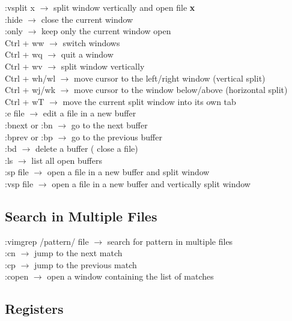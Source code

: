 \documentclass[twoside,a4paper]{article}
\newcommand{\tcb}{\color{blue}}
\newcommand{\tcc}{\color{cyan}}
\newcommand{\tcr}{\color{red}}
\newcommand{\tck}{\color{black}}
\newcommand{\ra }{$\rightarrow$ }
\begin{document}
\begin{multicols}{2}
		\tcr :vsplit x \tck \ra split window
		vertically and open file \textbf{x}\\
		\tcr :hide \tck \ra close the current 
		window\\
		\tcr :only \tck \ra keep only the 
		current window open\\
		\tcr Ctrl + ww \tck \ra switch windows\\
		\tcr Ctrl + wq \tck \ra quit a window\\
		\tcr Ctrl + wv \tck \ra split window 
		vertically\\
		\tcr Ctrl + wh/wl \tck \ra move cursor 
		to the left/right window (vertical split)\\
		\tcr Ctrl + wj/wk \tck \ra move cursor
		to the window below/above (horizontal split)\\
		\tcr Ctrl + wT \tck \ra move the 
		current split window into its own tab\\
		\tcr :e \tcb  file \tck \ra edit
		a file in a new buffer\\
		\tcr :bnext or :bn \tck \ra go to the 
		next buffer\\
		\tcr :bprev or :bp \tck \ra go to the
		previous buffer\\
		\tcr :bd \tck \ra delete a buffer (
		close a file)\\
		\tcr :ls \tck \ra list all open 
		buffers\\
		\tcr :sp \tcb  file \tck \ra 
		open a file in a new buffer and split window\\
		\tcr :vsp \tcb  file \tck $\rightarrow$
		open a file in a new buffer and vertically split window\\

	\vfill \null

	\vspace{-1 cm}
	\tcc \subsection{Search in Multiple Files}

		\tcr :vimgrep /pattern/ {file} \tck $\rightarrow$
		search for pattern in multiple files\\
		\tcr :cn \tck \ra jump to the next 
		match\\
		\tcr :cp \tck \ra jump to the previous 
		match\\
		\tcr :copen \tck \ra open a window 
		containing the list of matches

	\tcc \subsection{Registers}


\end{multicols}
\end{document}
